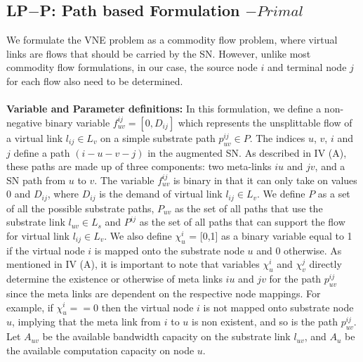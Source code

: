 \documentclass[journal]{IEEEtran}
\begin{document}
\subsection{\textbf{LP$-$P}: Path based Formulation $- Primal$}
We formulate the \ac{VNE} problem as a commodity flow problem\cite{Pfetsch06}, where virtual links are flows that should be carried by the \ac{SN}. However, unlike most commodity flow formulations, in our case, the source node $i$ and terminal node $j$ for each flow also need to be determined.\\\\
\textbf{Variable and Parameter definitions:} In this formulation, we define a non-negative binary variable $f_{uv}^{ij} = [0, D_{ij}]$ which represents the unsplittable flow of a virtual link $l_{ij} \in L_v$ on a simple substrate path $p_{uv}^{ij} \in P$. The indices $u$, $v$, $i$ and $j$ define a path $(i-u-v-j)$ in the augmented \ac{SN}. As described in IV (A), these paths are made up of three components:  two meta-links $iu$ and $jv$, and a \ac{SN} path from $u$ to $v$. The variable $f_{uv}^{ij}$ is binary in that it can only take on values $0$ and $D_{ij}$, where $D_{ij}$ is the demand of virtual link $l_{ij} \in L_v$. We define $P$ as a set of all the possible substrate paths, $P_{uv}$ as the set of all paths that use the substrate link $l_{uv} \in L_s$ and $P^{ij}$ as the set of all paths that can support the flow for virtual link $l_{ij} \in L_v$. We also define $\chi_{u}^{i}$ = [0,1] as a binary variable equal to 1 if the virtual node $i$ is mapped onto the substrate node $u$ and 0 otherwise. As mentioned in IV (A), it is important to note that variables $\chi_{u}^{i}$ and $\chi_{v}^{j}$ directly determine the existence or otherwise of meta links $iu$ and $jv$ for the path ${p_{uv}^{ij}}$ since the meta links are dependent on the respective node mappings. For example, if $\chi_{u}^{i} == 0$ then the virtual node $i$ is not mapped onto substrate node $u$, implying that the meta link from $i$ to $u$ is non existent, and so is the path ${p_{uv}^{ij}}$. Let $A_{uv}$ be the available bandwidth capacity on the substrate link $l_{uv}$, and $A_{u}$ be the available computation capacity on node $u$.\\\\
\end{document}
